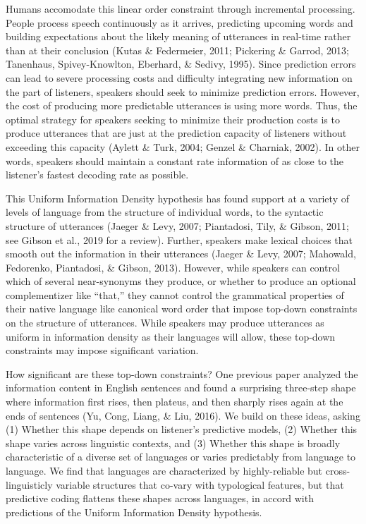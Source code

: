 \documentclass[10pt, letterpaper]{article}
\begin{document}
Humans accomodate this linear order constraint through incremental
processing. People process speech continuously as it arrives, predicting
upcoming words and building expectations about the likely meaning of
utterances in real-time rather than at their conclusion (Kutas \&
Federmeier, 2011; Pickering \& Garrod, 2013; Tanenhaus, Spivey-Knowlton,
Eberhard, \& Sedivy, 1995). Since prediction errors can lead to severe
processing costs and difficulty integrating new information on the part
of listeners, speakers should seek to minimize prediction errors.
However, the cost of producing more predictable utterances is using more
words. Thus, the optimal strategy for speakers seeking to minimize their
production costs is to produce utterances that are just at the
prediction capacity of listeners without exceeding this capacity (Aylett
\& Turk, 2004; Genzel \& Charniak, 2002). In other words, speakers
should maintain a constant rate information of as close to the
listener's fastest decoding rate as possible.

This Uniform Information Density hypothesis has found support at a
variety of levels of language from the structure of individual words, to
the syntactic structure of utterances (Jaeger \& Levy, 2007; Piantadosi,
Tily, \& Gibson, 2011; see Gibson et al., 2019 for a review). Further,
speakers make lexical choices that smooth out the information in their
utterances (Jaeger \& Levy, 2007; Mahowald, Fedorenko, Piantadosi, \&
Gibson, 2013). However, while speakers can control which of several
near-synonyms they produce, or whether to produce an optional
complementizer like ``that,'' they cannot control the grammatical
properties of their native language like canonical word order that
impose top-down constraints on the structure of utterances. While
speakers may produce utterances as uniform in information density as
their languages will allow, these top-down constraints may impose
significant variation.

How significant are these top-down constraints? One previous paper
analyzed the information content in English sentences and found a
surprising three-step shape where information first rises, then plateus,
and then sharply rises again at the ends of sentences (Yu, Cong, Liang,
\& Liu, 2016). We build on these ideas, asking (1) Whether this shape
depends on listener's predictive models, (2) Whether this shape varies
across linguistic contexts, and (3) Whether this shape is broadly
characteristic of a diverse set of languages or varies predictably from
language to language. We find that languages are characterized by
highly-reliable but cross-linguisticly variable structures that co-vary
with typological features, but that predictive coding flattens these
shapes across languages, in accord with predictions of the Uniform
Information Density hypothesis.
\end{document}

